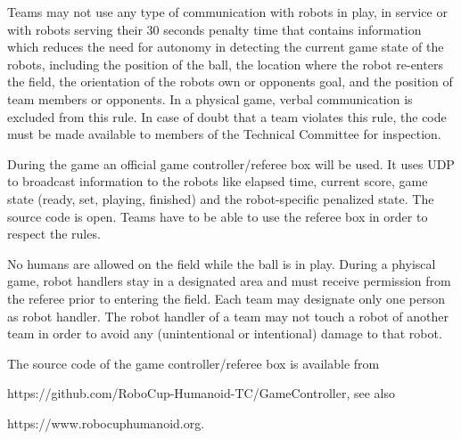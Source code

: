 \bigskip


Teams may not use any type of communication
with robots in play, in service or with robots serving their 30 seconds penalty
time that contains information which reduces the need for autonomy in detecting
the current game state of the robots, including the position of the ball,
the location where the robot re-enters the field,
the orientation of the robots own or opponents goal,
and the position of team members or opponents.
In a physical game, verbal communication is excluded from this rule.
In case of doubt that a team violates this rule,
the code must be made available to members of the Technical Committee for inspection.

\bigskip

During the game an official game controller/referee box will be used.
It uses UDP to broadcast information to the robots like elapsed time,
current score, game state (ready, set, playing, finished) and the robot-specific
penalized state. The source code is open.
Teams have to be able to use the referee box in order to respect the rules.



\bigskip

 No humans are allowed on the field while the
ball is in play.
During a phyiscal game, robot handlers stay in a designated area and must receive permission from the
referee prior to entering the field.
Each team may designate only one person as robot handler.
The robot handler of a team may not touch a robot of another team in order to
avoid any (unintentional or intentional) damage to that robot.

\bigskip


The source code of the game controller/referee box is available from

\textcolor[rgb]{0.0,0.0,0.49803922}{https://github.com/RoboCup-Humanoid-TC/GameController},
see also 

\textcolor[rgb]{0.0,0.0,0.49803922}{https://www.robocuphumanoid.org}.

